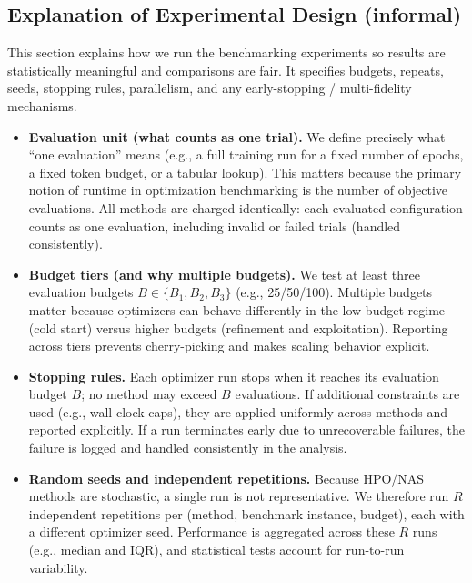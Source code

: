 \subsection*{Explanation of Experimental Design (informal)}
This section explains how we run the benchmarking experiments so results are statistically meaningful and comparisons are fair.
It specifies budgets, repeats, seeds, stopping rules, parallelism, and any early-stopping / multi-fidelity mechanisms.

\begin{itemize}
    \item \textbf{Evaluation unit (what counts as one trial).}
    We define precisely what ``one evaluation'' means (e.g., a full training run for a fixed number of epochs,
    a fixed token budget, or a tabular lookup).
    This matters because the primary notion of runtime in optimization benchmarking is the number of objective evaluations.
    All methods are charged identically: each evaluated configuration counts as one evaluation,
    including invalid or failed trials (handled consistently).

    \item \textbf{Budget tiers (and why multiple budgets).}
    We test at least three evaluation budgets \(B\in\{B_1,B_2,B_3\}\) (e.g., 25/50/100).
    Multiple budgets matter because optimizers can behave differently in the low-budget regime (cold start) versus higher budgets
    (refinement and exploitation). Reporting across tiers prevents cherry-picking and makes scaling behavior explicit.

    \item \textbf{Stopping rules.}
    Each optimizer run stops when it reaches its evaluation budget \(B\); no method may exceed \(B\) evaluations.
    If additional constraints are used (e.g., wall-clock caps), they are applied uniformly across methods and reported explicitly.
    If a run terminates early due to unrecoverable failures, the failure is logged and handled consistently in the analysis.

    \item \textbf{Random seeds and independent repetitions.}
    Because HPO/NAS methods are stochastic, a single run is not representative.
    We therefore run \(R\) independent repetitions per (method, benchmark instance, budget), each with a different optimizer seed.
    Performance is aggregated across these \(R\) runs (e.g., median and IQR), and statistical tests account for run-to-run variability.


\end{itemize}
